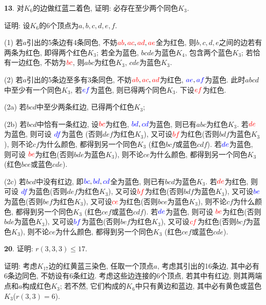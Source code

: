 \documentclass[12pt,a4paper]{article}
\begin{document}
\begin{CJK*}{GBK}{song}
\par \textbf{13}. 对$K_6$的边做红蓝二着色, 证明: 必存在至少两个同色$K_3$.
\par 证明: 设$K_6$的6个顶点为$a,b,c,d,e,f$.
\par (1) 若$a$引出的5条边有4条同色, 不妨$\textcolor{red}{ab},\textcolor{red}{ac},
\textcolor{red}{ad},\textcolor{red}{ae}$全为红色, 则$b,c,d,e$之间的边若有两条为红色, 即得两个红色$K_3$; 若全为蓝色, $bcde$为蓝色$K_4$, 包含两个蓝色$K_3$; 若恰有一边红色, 不妨为$\textcolor{red}{bc}$, 则$abc$为红色$K_3$, $cde$为蓝色$K_3$.
\par (2) 若$a$引出的5条边至多有3条同色, 不妨$\textcolor{red}{ab},\textcolor{red}{ac},\textcolor{red}{ad} $为红色, $\textcolor{blue}{ae},\textcolor{blue}{af}$为蓝色. 此时$abcd$中至少有一个同色$K_3$, 若$\textcolor{blue}{ef}$为蓝色, 则已得两个同色$K_3$. 下设$\textcolor{red}{ef}$为红色.
\par (2a) 若$bcd$中至少两条红边, 已得两个红色$K_3$;
\par (2b) 若$bcd$中恰有一条红边, 设$\textcolor{red}{bc}$为红色, $\textcolor{blue}{bd},
\textcolor{blue}{cd}$为蓝色, 则已有$abc$为红色$K_3$. 若$\textcolor{red}{de}$为蓝色, 则可设
$\textcolor{blue}{df}$为蓝色 (否则$def$为红色$K_3$), 又可设$\textcolor{red}{bf}$为红色(否则$bdf$为蓝色$K_3$), 则不论$cf$为什么颜色, 都得到另一个同色$K_3$ (红色$bcf$或蓝色$cdf$).
若$\textcolor{blue}{de}$为蓝色, 则可设
$\textcolor{red}{be}$为红色(否则$bde$为蓝色$K_3$), 则不论$ce$为什么颜色, 都得到另一个同色$K_3$ (红色$bce$或蓝色$cde$).
\par (2c) 若$bcd$中没有红边, 即$\textcolor{blue}{bc},\textcolor{blue}{bd},
\textcolor{blue}{cd}$全为蓝色, 则已有$bcd$为蓝色$K_3$.
若$\textcolor{red}{de}$为红色, 则可设
$\textcolor{blue}{df}$为蓝色(否则$def$为红色$K_3$), 又可设$\textcolor{red}{bf}$为红色(否则$bdf$为蓝色$K_3$), 又可设$\textcolor{blue}{be}$为蓝色(否则$bef$为红色$K_3$), 又可设$\textcolor{red}{ce}$为红色(否则$bce$为蓝色$K_3$), 则不论$cf$为什么颜色, 都得到另一个同色$K_3$ (红色$cef$或蓝色$cdf$).
若$\textcolor{blue}{de}$为蓝色, 则可设
$\textcolor{red}{be}$为红色(否则$bde$为蓝色$K_3$), 又可设$\textcolor{blue}{bf}$为蓝色(否则$bef$为红色$K_3$), 又可设$\textcolor{red}{cf}$为红色(否则$bcf$为蓝色$K_3$), 则不论$ce$为什么颜色, 都得到另一个同色$K_3$ (红色$cef$或蓝色$cde$).

\par \textbf{20}. 证明: $r(3,3,3)\le 17$.
\par 证明: 考虑$K_{17}$边的红黄蓝三染色, 任取一个顶点$a$, 考虑其引出的16条边, 其中必有6条边同色, 不妨设有6条红边. 考虑这些边连接的6个顶点, 若其中有红边, 则其两端点和$a$构成红色$K_3$; 若不然, 它们构成的$K_6$中只有黄边和蓝边, 其中必有黄色或蓝色$K_3$($r(3,3)=6$).


\end{CJK*}
\end{document}
